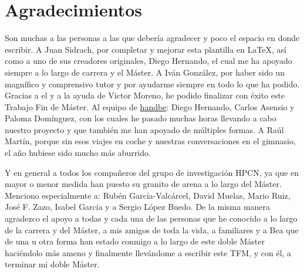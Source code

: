 \chapter*{Agradecimientos}

Son muchas a las personas a las que debería agradecer y poco el espacio en donde escribir.
A Juan Sidrach, por completar y mejorar esta plantilla en \LaTeX, así como a uno de sus creadores originales, Diego Hernando, el cual me ha apoyado siempre a lo largo de carrera y el Máster.
A Iván González, por haber sido un magnífico y comprensivo tutor y por ayudarme siempre en todo lo que ha podido. Gracias a el y a la ayuda de Victor Moreno, he podido finalizar con éxito este Trabajo Fin de Máster.
Al equipo de \href{http://www.handbe.com}{handbe}: Diego Hernando, Carlos Asensio y Paloma Domínguez, con los cuales he pasado muchas horas llevando a cabo nuestro proyecto y que también me han apoyado de múltiples formas.
A Raúl Martín, porque sin esos viajes en coche y nuestras conversaciones en el gimnasio, el año hubiese sido mucho más aburrido.

Y en general a todos los compañeros del grupo de investigación HPCN, ya que en mayor o menor medida han puesto su granito de arena a lo largo del Máster. Menciono especialmente a: Rubén García-Valcárcel, David Muelas, Mario Ruiz, José F. Zazo, Isabel García y a Sergio López Buedo.
De la misma manera agradezco el apoyo a todas y cada una de las personas que he conocido a lo largo de la carrera y del Máster, a mis amigos de toda la vida, a familiares y a Bea que de una u otra forma han estado conmigo a lo largo de este doble Máster haciéndolo más ameno y finalmente llevándome a escribir este TFM, y con él, a terminar mi doble Máster.

